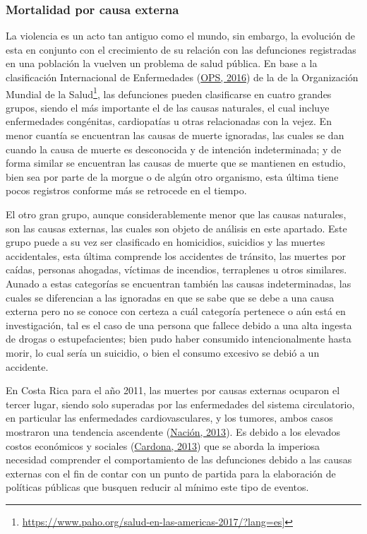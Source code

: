 \documentclass[
]{article}
\begin{document}
\subsubsection{Mortalidad por causa externa}

La violencia es un acto tan antiguo como el mundo, sin embargo, la
evolución de esta en conjunto con el crecimiento de su relación con las
defunciones registradas en una población la vuelven un problema de salud
pública. En base a la clasificación Internacional de Enfermedades
(\protect\hyperlink{ref-CIE10}{OPS, 2016}) de la de la Organización
Mundial de la Salud\footnote{\url{https://www.paho.org/salud-en-las-americas-2017/?lang=es}{]}},
las defunciones pueden clasificarse en cuatro grandes grupos, siendo el
más importante el de las causas naturales, el cual incluye enfermedades
congénitas, cardiopatías u otras relacionadas con la vejez. En menor
cuantía se encuentran las causas de muerte ignoradas, las cuales se dan
cuando la causa de muerte es desconocida y de intención indeterminada; y
de forma similar se encuentran las causas de muerte que se mantienen en
estudio, bien sea por parte de la morgue o de algún otro organismo, esta
última tiene pocos registros conforme más se retrocede en el tiempo.

El otro gran grupo, aunque considerablemente menor que las causas
naturales, son las causas externas, las cuales son objeto de análisis en
este apartado. Este grupo puede a su vez ser clasificado en homicidios,
suicidios y las muertes accidentales, esta última comprende los
accidentes de tránsito, las muertes por caídas, personas ahogadas,
víctimas de incendios, terraplenes u otros similares. Aunado a estas
categorías se encuentran también las causas indeterminadas, las cuales
se diferencian a las ignoradas en que se sabe que se debe a una causa
externa pero no se conoce con certeza a cuál categoría pertenece o aún
está en investigación, tal es el caso de una persona que fallece debido
a una alta ingesta de drogas o estupefacientes; bien pudo haber
consumido intencionalmente hasta morir, lo cual sería un suicidio, o
bien el consumo excesivo se debió a un accidente.

En Costa Rica para el año 2011, las muertes por causas externas ocuparon
el tercer lugar, siendo solo superadas por las enfermedades del sistema
circulatorio, en particular las enfermedades cardiovasculares, y los
tumores, ambos casos mostraron una tendencia ascendente
(\protect\hyperlink{ref-nacion}{Nación, 2013}). Es debido a los elevados
costos económicos y sociales
(\protect\hyperlink{ref-ccpexternas}{Cardona, 2013}) que se aborda la
imperiosa necesidad comprender el comportamiento de las defunciones
debido a las causas externas con el fin de contar con un punto de
partida para la elaboración de políticas públicas que busquen reducir al
mínimo este tipo de eventos.
\end{document}
